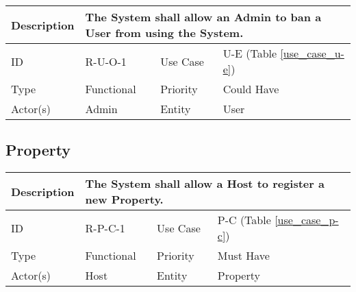 \begin{tabular}{|p{1.5cm}|p{1.5cm}|p{1.5cm}|p{1.5cm}|p{1.5cm}|p{1.5cm}|p{1.5cm}|p{1.5cm}|p{1.5cm}|p{1.5cm}|p{1.5cm}|p{1.5cm}|}
    \hline
    \multicolumn{2}{|o|}{Description} & \multicolumn{10}{p{12.5cm}|}{The System shall allow an Admin to ban a User from using the System.} \\ \hline
    \multicolumn{2}{|o|}{ID}          & \multicolumn{4}{n}{R-U-O-1}            & \multicolumn{2}{|o|}{Use Case}    & \multicolumn{4}{n|}{U-E (Table \ref{use_case_u-e})} \\ \hline
    \multicolumn{2}{|o|}{Type}        & \multicolumn{4}{n}{Functional}         & \multicolumn{2}{|o|}{Priority}    & \multicolumn{4}{n|}{Could Have}  \\ \hline
    \multicolumn{2}{|o|}{Actor(s)}    & \multicolumn{4}{n}{Admin}              & \multicolumn{2}{|o|}{Entity}      & \multicolumn{4}{n|}{User} \\ \hline
\end{tabular}

\subsection{Property}

\begin{tabular}{|p{1.5cm}|p{1.5cm}|p{1.5cm}|p{1.5cm}|p{1.5cm}|p{1.5cm}|p{1.5cm}|p{1.5cm}|p{1.5cm}|p{1.5cm}|p{1.5cm}|p{1.5cm}|}
    \hline
    \multicolumn{2}{|o|}{Description} & \multicolumn{10}{p{12.5cm}|}{The System shall allow a Host to register a new Property.} \\ \hline
    \multicolumn{2}{|o|}{ID}          & \multicolumn{4}{n}{R-P-C-1}            & \multicolumn{2}{|o|}{Use Case}    & \multicolumn{4}{n|}{P-C (Table \ref{use_case_p-c})} \\ \hline
    \multicolumn{2}{|o|}{Type}        & \multicolumn{4}{n}{Functional}         & \multicolumn{2}{|o|}{Priority}    & \multicolumn{4}{n|}{Must Have}  \\ \hline
    \multicolumn{2}{|o|}{Actor(s)}    & \multicolumn{4}{n}{Host}               & \multicolumn{2}{|o|}{Entity}      & \multicolumn{4}{n|}{Property} \\ \hline
\end{tabular}

